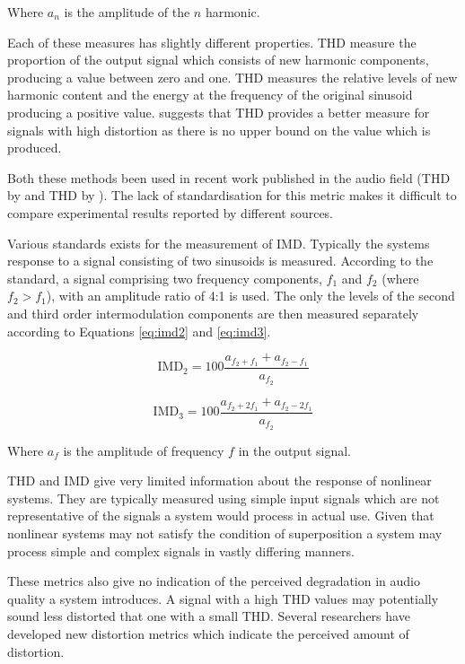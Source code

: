 		Where $a_n$ is the amplitude of the $n$ harmonic. 

		Each of these measures has slightly different properties. THD measure the proportion of the output
		signal which consists of new harmonic components, producing a value between zero and one. THD
		measures the relative levels of new harmonic content and the energy at the frequency of the original
		sinusoid producing a positive value. \citet{shmilovitz2005on} suggests that THD provides a better
		measure for signals with high distortion as there is no upper bound on the value which is produced.

		Both these methods been used in recent work published in the audio field (THD by
		\citet{fleischmann2014a} and THD by \citet{dutilleux2011nonlinear}). The lack of standardisation for
		this metric makes it difficult to compare experimental results reported by different sources.

		Various standards exists for the measurement of IMD. Typically the systems response to a signal consisting
		of two sinusoids is measured. According to the \citet{IEC2001amplifiers} standard, a signal comprising two
		frequency components, $f_{1}$ and $f_{2}$ (where $f_{2} > f_{1}$), with an amplitude ratio of 4:1 is used.
		The only the levels of the second and third order intermodulation components are then measured separately
		according to Equations \ref{eq:imd2} and \ref{eq:imd3}.

		\begin{equation}
			\textrm{IMD}_{2} = 100\frac{a_{f_{2} + f_{1}} + a_{f_{2} - f_{1}}}{a_{f_{2}}}
			\label{eq:imd2}
		\end{equation}

		\begin{equation}
			\textrm{IMD}_{3} = 100\frac{a_{f_{2} + 2f_{1}} + a_{f_{2} - 2f_{1}}}{a_{f_{2}}}
			\label{eq:imd3}
		\end{equation}

		Where $a_{f}$ is the amplitude of frequency $f$ in the output signal.

		THD and IMD give very limited information about the response of nonlinear systems. They are typically
		measured using simple input signals which are not representative of the signals a system would process in
		actual use. Given that nonlinear systems may not satisfy the condition of superposition a system may
		process simple and complex signals in vastly differing manners. 

		These metrics also give no indication of the perceived degradation in audio quality a system introduces. A
		signal with a high THD values may potentially sound less distorted that one with a small THD. Several
		researchers have developed new distortion metrics which indicate the perceived amount of distortion.

